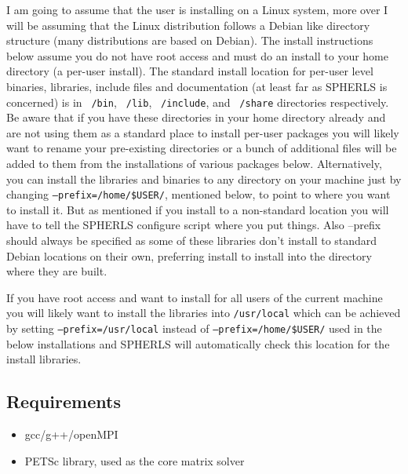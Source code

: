 \documentclass[11pt]{article}
\begin{document}
I am going to assume that the user is installing on a Linux system, more over I will be assuming that the Linux distribution follows a Debian like directory structure (many distributions are based on Debian). The install instructions below assume you do not have root access and must do an install to your home directory (a per-user install). The standard install location for per-user level binaries, libraries, include files and documentation  (at least far as SPHERLS is concerned) is in {\tt ~/bin}, {\tt ~/lib}, {\tt ~/include}, and {\tt ~/share} directories respectively. Be aware that if you have these directories in your home directory already and are not using them as a standard place to install per-user packages you will likely want to rename your pre-existing directories or a bunch of additional files will be added to them from the installations of various packages below. Alternatively, you can install the libraries and binaries to any directory on your machine just by changing {\tt --prefix=/home/\$USER/}, mentioned below, to point to where you want to install it. But as mentioned if you install to a non-standard location you will have to tell the SPHERLS configure script where you put things. Also --prefix should always be specified as some of these libraries don't install to standard Debian locations on their own, preferring install to install into the directory where they are built.

If you have root access and want to install for all users of the current machine you will likely want to install the libraries into {\tt /usr/local}  which can be achieved by setting {\tt --prefix=/usr/local} instead of {\tt --prefix=/home/\$USER/} used in the below installations and SPHERLS will automatically check this location for the install libraries.
    
\subsection{Requirements}
\begin{itemize}
\item gcc/g++/openMPI
\item PETSc library, used as the core matrix solver
\end{itemize}
\end{document}

